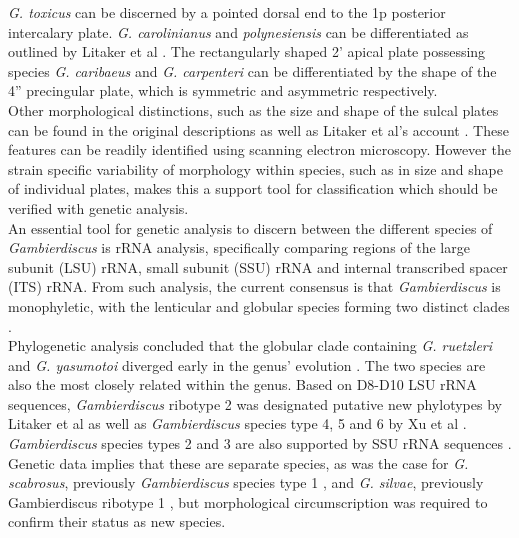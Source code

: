 \documentclass[12pt]{article}
\begin{document}
\emph{G. toxicus} can be discerned by a pointed dorsal end to the 1p posterior intercalary plate. \emph{G. carolinianus} and \emph{polynesiensis} can be differentiated as outlined by Litaker et al \cite{litaker2009taxonomy}. The rectangularly shaped 2' apical plate possessing species \emph{G. caribaeus} and \emph{G. carpenteri} can be differentiated by the shape of the 4'' precingular plate, which is symmetric and asymmetric respectively. \\
Other morphological distinctions, such as the size and shape of the sulcal plates can be found in the original descriptions as well as Litaker et al's account \cite{litaker2009taxonomy,fraga2011gambierdiscus,faust1995observation,holmes1998gambierdiscus,chinain1999morphology}. %
These features can be readily identified using scanning electron microscopy. However the strain specific variability of morphology within species, such as in size and shape of individual plates, makes this a support tool for classification which should be verified with genetic analysis. \\

An essential tool for genetic analysis to discern between the different species of \emph{Gambierdiscus} is rRNA analysis, specifically comparing regions of the large subunit (LSU) rRNA, small subunit (SSU) rRNA and internal transcribed spacer (ITS) rRNA. From such analysis, the current consensus is that \emph{Gambierdiscus} is monophyletic, with the lenticular and globular species forming two distinct clades \cite{chinain1999morphology,litaker2009taxonomy,fraga2011gambierdiscus,richlen2008phylogeography,kuno2010genetic,litaker2010global,nishimura2013genetic}. \\
Phylogenetic analysis concluded that the globular clade containing \emph{G. ruetzleri} and \emph{G. yasumotoi} diverged early in the genus' evolution \cite{litaker2009taxonomy,nishimura2013genetic}. The two species are also the most closely related within the genus. 
Based on D8-D10 LSU rRNA sequences, \emph{Gambierdiscus} ribotype 2 was designated putative new phylotypes by Litaker et al as well as \emph{Gambierdiscus} species type 4, 5 and 6 by Xu et al \cite{litaker2010global,xu2014distribution}. \emph{Gambierdiscus} species types 2 and 3 are also supported by SSU rRNA sequences \cite{nishimura2013genetic,kuno2010genetic}. Genetic data implies that these are separate species, as was the case for \emph{G. scabrosus}, previously \emph{Gambierdiscus} species type 1 \cite{nishimura2013genetic,nishimura2014morphology},  and \emph{G. silvae}, previously Gambierdiscus ribotype 1 \cite{fraga2014genus}, but morphological circumscription was required to confirm their status as new species. \\
\end{document}
